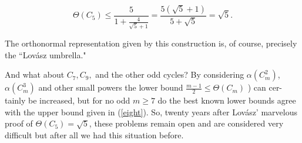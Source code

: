 \documentclass[openany,12pt]{memoir}
\begin{document}
\[
\Theta(C_5) \leq {\frac{5}{1 + {\frac{4}{\sqrt{5}+1}}}}={\frac{5(\sqrt{5}+1)}{5+\sqrt{5}}} = \sqrt{5}.
\]

The orthonormal representation given by this construction is, of course, 
precisely the ``Lov\'asz umbrella."\\


And what about $C_7, C_9,$ and the other odd cycles? By considering $\alpha(C_m^2)$,
$\alpha(C_m^3)$ and other small powers the lower bound ${\frac{m-1}{2}} \leq \Theta(C_m)$ ) can cer-
tainly be increased, but for no odd $m \geq 7$  do the best known lower bounds
agree with the upper bound given in (\ref{eight}). So, twenty years after Lov\'asz' 
marvelous proof of $\Theta(C_5) = \sqrt{5}$, these problems remain open and are 
considered very difficult \text{---} but after all we had this situation before.\\
\end{document}
